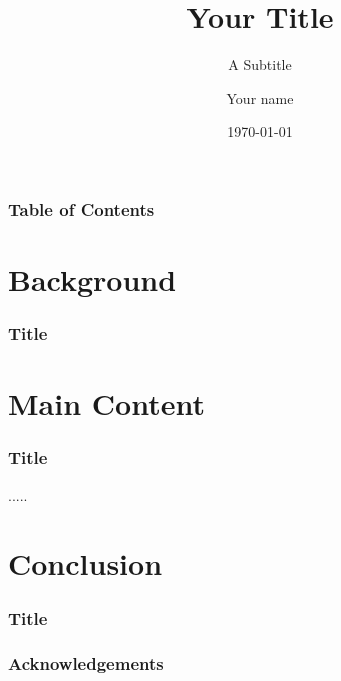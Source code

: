 \documentclass[aspectratio=169]{beamer}
\title{Your Title}
\subtitle{A Subtitle}
\author{Your name}
\institute{Montana State University\\ Gianforte College of Computing}
\date{\today}
\begin{document}
\begin{frame}
	\titlepage



\end{frame}
\begin{frame}
	\frametitle{Table of Contents}
	\tableofcontents



\end{frame}


\section{Background}
\begin{frame}
	\frametitle{Title}



\end{frame}



\section{Main Content}
\begin{frame}
	\frametitle{Title}
.....


\end{frame}



\section{Conclusion}
\begin{frame}
	\frametitle{Title}



\end{frame}


\begin{frame}
	\frametitle{Acknowledgements}



\end{frame}
\end{document}
